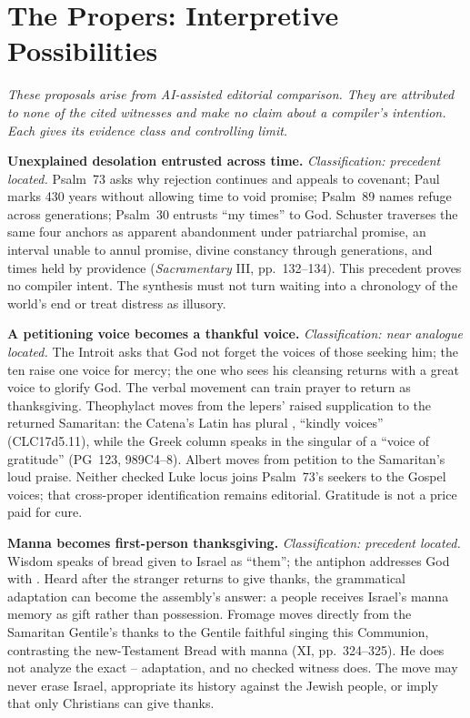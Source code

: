\sectionguard
\section*{The Propers: Interpretive Possibilities}

\noindent\emph{These proposals arise from AI-assisted editorial comparison.
They are attributed to none of the cited witnesses and make no claim about a
compiler's intention. Each gives its evidence class and controlling limit.}

\noindent\textbf{Unexplained desolation entrusted across time.\enspace{}}
\emph{Classification: precedent located.} Psalm~73 asks why rejection
continues and appeals to covenant; Paul marks 430 years without allowing time
to void promise; Psalm~89 names refuge across generations; Psalm~30 entrusts
``my times'' to God. Schuster traverses the same four anchors as apparent
abandonment under patriarchal promise, an interval unable to annul promise,
divine constancy through generations, and times held by providence
(\emph{Sacramentary} III, pp.~132--134). This precedent proves no compiler
intent. The synthesis must not turn
waiting into a chronology of the world's end or treat distress as illusory.

\noindent\textbf{A petitioning voice becomes a thankful voice.\enspace{}}
\emph{Classification: near analogue located.} The Introit asks
that God not forget the voices of those seeking him; the ten raise one voice
for mercy; the one who sees his cleansing returns with a great voice to
glorify God. The verbal movement can train prayer to return as thanksgiving.
Theophylact moves from the lepers' raised supplication to the returned
Samaritan: the Catena's Latin has plural , ``kindly
voices'' (CLC17d5.11), while the Greek column speaks in the singular of a
``voice of gratitude'' (PG~123, 989C4--8). Albert moves from petition to the
Samaritan's loud praise. Neither checked
Luke locus joins Psalm~73's seekers to the Gospel voices;
that cross-proper identification remains editorial. Gratitude is not a price
paid for cure.

\noindent\textbf{Manna becomes first-person thanksgiving.\enspace{}}
\emph{Classification: precedent located.} Wisdom speaks of bread given
to Israel as ``them''; the antiphon addresses God with . Heard after the stranger returns to give thanks, the grammatical
adaptation can become the assembly's answer: a people receives Israel's manna
memory as gift rather than possession. Fromage moves directly from the
Samaritan Gentile's thanks to the Gentile faithful singing this Communion,
contrasting the new-Testament Bread with manna (XI, pp.~324--325). He does not
analyze the exact -- adaptation, and no checked
witness does. The move may never
erase Israel, appropriate its history against the Jewish people, or imply
that only Christians can give thanks.

